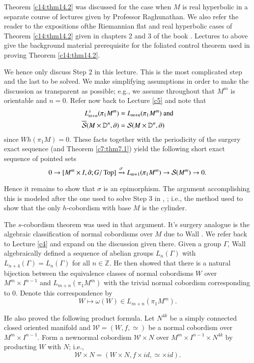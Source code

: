 Theorem \ref{c14:thm14.2} was discussed for the case when $M$ is real
hyperbolic in a separate course of lectures given by Professor
Raghunathan. We also refer the reader to the expositions
of\pageoriginale the Riemannian flat and real hyperbolic cases of
Theorem \ref{c14:thm14.2} given in chapters 2 and 3 of the book
\cite{40}. Lectures \cite{9} to \cite{13} above give the background material
prerequisite for the foliated control theorem used in proving Theorem
\ref{c14:thm14.2}. 

We hence only discuss Step 2 in this lecture. This is the most
complicated step and the last to be solved. We make simplifying
assumptions in order to make the discussion as transparent as
possible; e.g., we assume throughout that $M^m$ is orientable and
$n=0$. Refer now back to Lecture \ref{c5} and note that
\begin{align*}
  L^s_{m+n} (\pi_1 M^m) & = L_{m+n} (\pi_1 M^m) ~\text{and}\\
  \overline{\mathcal{S}} (M \times \mathbb{D}^n, \partial) & = \mathcal{S} (M
    \times \mathbb{D}^n, \partial)
\end{align*}
since $Wh (\pi_1 M)=0$. These facts together with the periodicity of
the surgery exact sequence (and Theorem \ref{c7:thm7.1}) yield the
following short exact sequence of pointed sets 
$$
0 \to [M^m \times I, \partial; G/\operatorname{Top}] \xrightarrow{\sigma} L_{m+1}
(\pi_1 M^m) \to \mathcal{S}(M^m) \to 0.
$$

Hence it remains to show that $\sigma$ is an epimorphism. The argument
accomplishing this is modeled after the one used to solve Step 3 in
\cite{36}, \cite{42}; i.e., the method used to show that the only
$h$-cobordism with base $M$ is the cylinder.

The $s$-cobordism theorem was used in that argument. It's surgery
analogue is the algebraic classification of normal cobordisms over $M$
due to Wall \cite{96}. We refer back to Lecture \ref{c4} and expand on
the discussion given there. Given a group $\Gamma$, Wall algebraically
defined a sequence of abelian groups $L_n (\Gamma)$ with $L_{n+4}
(\Gamma)= L_n (\Gamma)$ for all $n \in \mathbb{Z}$. He then showed
that there is a natural bijection between the equivalence classes of
normal cobordisms $W$ over $M^m \times I^{n-1}$ and $L_{m+n} (\pi_1
M^m)$ with the trivial normal cobordism corresponding to 0. Denote
this correspondence by
$$
W \mapsto \omega (W) \in L_{m+n} (\pi_1 M^m).
$$

He also proved the following product formula. Let $N^{4k}$ be a simply
connected closed oriented manifold and $\mathcal{W}= (W, f, \simeq)$
be a normal cobordism over $M^m \times I^{n-1}$. Form a
new\pageoriginale normal cobordism $\mathcal{W} \times N$ over $M^m
\times I^{n-1}\times N^{4k}$ by producting $W$ with $N$; i.e., 
$$
\mathcal{W} \times N = (W \times N, f \times id, \simeq \times id).
$$

